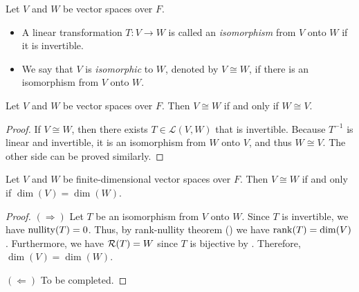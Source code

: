 \begin{definition}
  Let $V$ and $W$ be vector spaces over $F$.
  \begin{itemize}
    \item A linear transformation $T: V \to W$ is called an \emph{isomorphism}
      from $V$ onto $W$ if it is invertible.
    \item We say that $V$ is \emph{isomorphic} to $W$, denoted by $V \cong W$,
      if there is an isomorphism from $V$ onto $W$.
  \end{itemize}
\end{definition}

\begin{proposition}
  Let $V$ and $W$ be vector spaces over $F$. Then $V \cong W$ if and only if
  $W \cong V$.
\end{proposition}
\begin{proof}
  If $V \cong W$, then there exists $T \in \mathcal{L}(V, W)$ that is
  invertible.
  Because $T^{-1}$ is linear and invertible, it is an isomorphism from $W$ onto
  $V$, and thus $W \cong V$.
  The other side can be proved similarly.
\end{proof}

\begin{theorem}
  Let $V$ and $W$ be finite-dimensional vector spaces over $F$.
  Then $V \cong W$ if and only if $\dim(V) = \dim(W)$.
\end{theorem}
\begin{proof}
  $(\Rightarrow)$
  Let $T$ be an isomorphism from $V$ onto $W$.
  Since $T$ is invertible, we have $\operatorname{nullity}(T) = 0$.
  Thus, by rank-nullity theorem () we have
  $\operatorname{rank}(T) = \dim(V)$.
  Furthermore, we have $\mathcal{R}(T) = W$ since $T$ is bijective by
  .
  Therefore, $\dim(V) = \dim(W)$.

  $(\Leftarrow)$
  To be completed.
\end{proof}